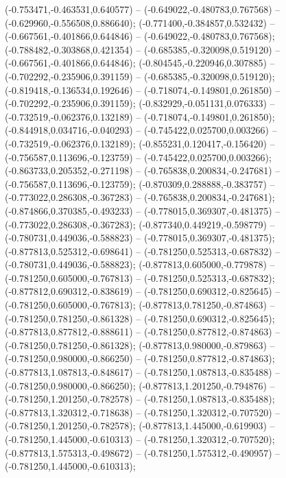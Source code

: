  (-0.753471,-0.463531,0.640577) -- (-0.649022,-0.480783,0.767568) -- (-0.629960,-0.556508,0.886640);
 (-0.771400,-0.384857,0.532432) -- (-0.667561,-0.401866,0.644846) -- (-0.649022,-0.480783,0.767568);
 (-0.788482,-0.303868,0.421354) -- (-0.685385,-0.320098,0.519120) -- (-0.667561,-0.401866,0.644846);
 (-0.804545,-0.220946,0.307885) -- (-0.702292,-0.235906,0.391159) -- (-0.685385,-0.320098,0.519120);
 (-0.819418,-0.136534,0.192646) -- (-0.718074,-0.149801,0.261850) -- (-0.702292,-0.235906,0.391159);
 (-0.832929,-0.051131,0.076333) -- (-0.732519,-0.062376,0.132189) -- (-0.718074,-0.149801,0.261850);
 (-0.844918,0.034716,-0.040293) -- (-0.745422,0.025700,0.003266) -- (-0.732519,-0.062376,0.132189);
 (-0.855231,0.120417,-0.156420) -- (-0.756587,0.113696,-0.123759) -- (-0.745422,0.025700,0.003266);
 (-0.863733,0.205352,-0.271198) -- (-0.765838,0.200834,-0.247681) -- (-0.756587,0.113696,-0.123759);
 (-0.870309,0.288888,-0.383757) -- (-0.773022,0.286308,-0.367283) -- (-0.765838,0.200834,-0.247681);
 (-0.874866,0.370385,-0.493233) -- (-0.778015,0.369307,-0.481375) -- (-0.773022,0.286308,-0.367283);
 (-0.877340,0.449219,-0.598779) -- (-0.780731,0.449036,-0.588823) -- (-0.778015,0.369307,-0.481375);
 (-0.877813,0.525312,-0.698641) -- (-0.781250,0.525313,-0.687832) -- (-0.780731,0.449036,-0.588823);
 (-0.877813,0.605000,-0.779878) -- (-0.781250,0.605000,-0.767813) -- (-0.781250,0.525313,-0.687832);
 (-0.877812,0.690312,-0.838619) -- (-0.781250,0.690312,-0.825645) -- (-0.781250,0.605000,-0.767813);
 (-0.877813,0.781250,-0.874863) -- (-0.781250,0.781250,-0.861328) -- (-0.781250,0.690312,-0.825645);
 (-0.877813,0.877812,-0.888611) -- (-0.781250,0.877812,-0.874863) -- (-0.781250,0.781250,-0.861328);
 (-0.877813,0.980000,-0.879863) -- (-0.781250,0.980000,-0.866250) -- (-0.781250,0.877812,-0.874863);
 (-0.877813,1.087813,-0.848617) -- (-0.781250,1.087813,-0.835488) -- (-0.781250,0.980000,-0.866250);
 (-0.877813,1.201250,-0.794876) -- (-0.781250,1.201250,-0.782578) -- (-0.781250,1.087813,-0.835488);
 (-0.877813,1.320312,-0.718638) -- (-0.781250,1.320312,-0.707520) -- (-0.781250,1.201250,-0.782578);
 (-0.877813,1.445000,-0.619903) -- (-0.781250,1.445000,-0.610313) -- (-0.781250,1.320312,-0.707520);
 (-0.877813,1.575313,-0.498672) -- (-0.781250,1.575312,-0.490957) -- (-0.781250,1.445000,-0.610313);
